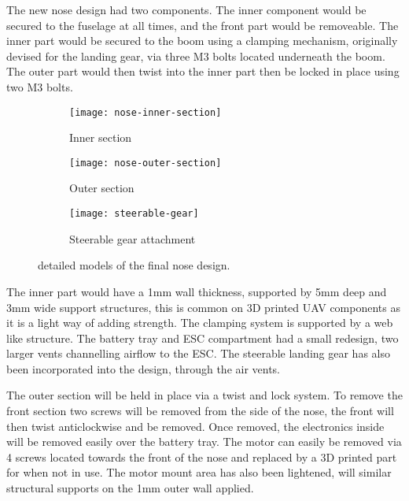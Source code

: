 \documentclass[../../main.tex]{subfiles}
\begin{document}
The new nose design had two components.
The inner component would be secured to the fuselage at all times, and the front part would be removeable.
The inner part would be secured to the boom using a clamping mechanism, originally devised for the landing gear, via three M3 bolts located underneath the boom.
The outer part would then twist into the inner part then be locked in place using two M3 bolts. 

\begin{figure}[H]
    \centering
    \begin{subfigure}[b]{0.6\columnwidth}
        \centering
        \texttt{[image: nose-inner-section]}
        \caption{Inner section}
        \label{fig:nose-design:inner}
    \end{subfigure}
    
    \begin{subfigure}[b]{0.6\columnwidth}
        \centering
        \texttt{[image: nose-outer-section]}
        \caption{Outer section}
        \label{fig:nose-design:outer}
    \end{subfigure}

    \begin{subfigure}[b]{0.6\columnwidth}
        \centering
        \texttt{[image: steerable-gear]}
        \caption{Steerable gear attachment}
        \label{fig:nose-design:steerable-nose-gear}
    \end{subfigure}
    
    \caption{detailed models of the final nose design.}
    \label{fig:nose-design}
\end{figure} 


The inner part would have a 1mm wall thickness, supported by 5mm deep and 3mm wide support structures, this is common on 3D printed UAV components as it is a light way of adding strength.
The clamping system is supported by a web like structure.
The battery tray and ESC compartment had a small redesign, two larger vents channelling airflow to the ESC.
The steerable landing gear has also been incorporated into the design, through the air vents. 


The outer section will be held in place via a twist and lock system.
To remove the front section two screws will be removed from the side of the nose, the front will then twist anticlockwise and be removed.
Once removed, the electronics inside will be removed easily over the battery tray.
The motor can easily be removed via 4 screws located towards the front of the nose and replaced by a 3D printed part for when not in use.
The motor mount area has also been lightened, will similar structural supports on the 1mm outer wall applied. 
\end{document}
